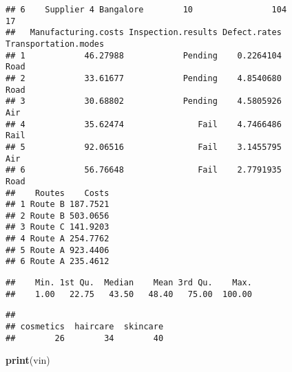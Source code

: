 \documentclass[
]{article}
\newenvironment{Shaded}{\begin{snugshade}}{\end{snugshade}}
\newcommand{\FunctionTok}[1]{\textcolor[rgb]{0.13,0.29,0.53}{\textbf{#1}}}
\newcommand{\NormalTok}[1]{#1}
\newcommand{\SpecialCharTok}[1]{\textcolor[rgb]{0.81,0.36,0.00}{\textbf{#1}}}
\begin{document}
\begin{verbatim}
## 6    Supplier 4 Bangalore        10                104                      17
##   Manufacturing.costs Inspection.results Defect.rates Transportation.modes
## 1            46.27988            Pending    0.2264104                 Road
## 2            33.61677            Pending    4.8540680                 Road
## 3            30.68802            Pending    4.5805926                  Air
## 4            35.62474               Fail    4.7466486                 Rail
## 5            92.06516               Fail    3.1455795                  Air
## 6            56.76648               Fail    2.7791935                 Road
##    Routes    Costs
## 1 Route B 187.7521
## 2 Route B 503.0656
## 3 Route C 141.9203
## 4 Route A 254.7762
## 5 Route A 923.4406
## 6 Route A 235.4612
\end{verbatim}

\begin{Shaded}
\end{Shaded}

\begin{verbatim}
##    Min. 1st Qu.  Median    Mean 3rd Qu.    Max. 
##    1.00   22.75   43.50   48.40   75.00  100.00
\end{verbatim}

\begin{Shaded}
\end{Shaded}

\begin{verbatim}
## 
## cosmetics  haircare  skincare 
##        26        34        40
\end{verbatim}

\begin{Shaded}
\begin{Highlighting}[]
\FunctionTok{print}\NormalTok{(vin)}
\end{Highlighting}
\end{Shaded}
\end{document}
